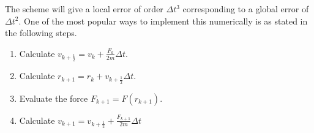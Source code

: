 The scheme will give a local error of order $\Delta t^3$ corresponding to a
global error of $\Delta t^2$. One of the most popular ways to implement this
numerically is as stated in the following steps.
\begin{enumerate}
  \centering
  \item Calculate $v_{k+\frac{1}{2}} = v_k + \frac{F_k}{2m} \Delta t$.
  \item Calculate $r_{k+1} = r_k + v_{k+\frac{1}{2}} \Delta t$.
  \item Evaluate the force $F_{k+1} = F(r_{k+1})$.
  \item Calculate $v_{k+1} = v_{k+\frac{1}{2}} + \frac{F_{k+1}}{2m} \Delta t$  
\end{enumerate}











